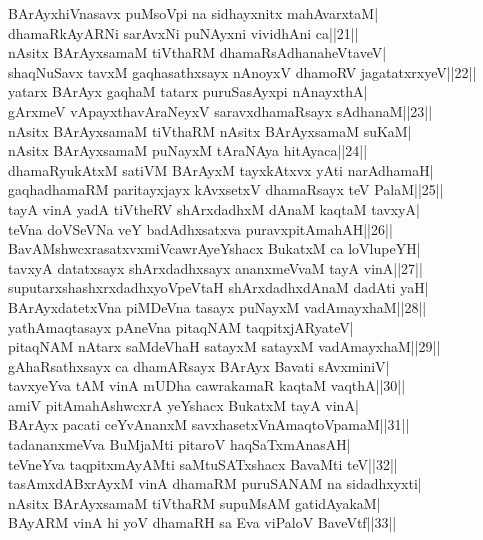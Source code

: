 \documentclass{article}
\begin{document}
BArAyxhiVnasavx puMsoVpi na sidhayxnitx mahAvarxtaM|\\
dhamaRkAyARNi sarAvxNi puNAyxni vividhAni ca||21||\\
nAsitx BArAyxsamaM tiVthaRM dhamaRsAdhanaheVtaveV|\\
shaqNuSavx tavxM gaqhasathxsayx nAnoyxV dhamoRV jagatatxrxyeV||22||\\
yatarx BArAyx gaqhaM tatarx puruSasAyxpi nAnayxthA|\\
gArxmeV vApayxthavAraNeyxV saravxdhamaRsayx sAdhanaM||23||\\
nAsitx BArAyxsamaM tiVthaRM nAsitx BArAyxsamaM suKaM|\\
nAsitx BArAyxsamaM puNayxM tAraNAya hitAyaca||24||\\
dhamaRyukAtxM satiVM BArAyxM tayxkAtxvx yAti narAdhamaH|\\
gaqhadhamaRM paritayxjayx kAvxsetxV dhamaRsayx teV PalaM||25||\\
tayA vinA yadA tiVtheRV shArxdadhxM dAnaM kaqtaM tavxyA|\\
teVna doVSeVNa veY badAdhxsatxva puravxpitAmahAH||26||\\
BavAMshwcxrasatxvxmiVcawrAyeYshacx BukatxM ca loVlupeYH|\\
tavxyA datatxsayx shArxdadhxsayx ananxmeVvaM tayA vinA||27||\\
suputarxshashxrxdadhxyoVpeVtaH shArxdadhxdAnaM dadAti yaH|\\
BArAyxdatetxVna piMDeVna tasayx puNayxM vadAmayxhaM||28||\\
yathAmaqtasayx pAneVna pitaqNAM taqpitxjARyateV|\\
pitaqNAM nAtarx saMdeVhaH satayxM satayxM vadAmayxhaM||29||\\
gAhaRsathxsayx ca dhamARsayx BArAyx Bavati sAvxminiV|\\
tavxyeYva tAM vinA mUDha cawrakamaR kaqtaM vaqthA||30||\\
amiV pitAmahAshwcxrA yeYshacx BukatxM tayA vinA|\\
BArAyx pacati ceYvAnanxM savxhasetxVnAmaqtoVpamaM||31||\\
tadananxmeVva BuMjaMti pitaroV haqSaTxmAnasAH|\\
teVneYva taqpitxmAyAMti saMtuSATxshacx BavaMti teV||32||\\
tasAmxdABxrAyxM vinA dhamaRM puruSANAM na sidadhxyxti|\\
nAsitx BArAyxsamaM tiVthaRM supuMsAM gatidAyakaM|\\
BAyARM vinA hi yoV dhamaRH sa Eva viPaloV BaveVtf||33||
\end{document}

